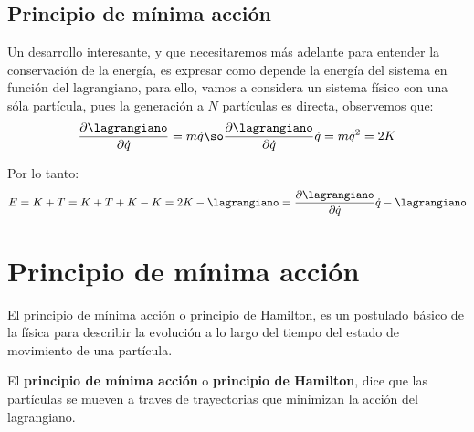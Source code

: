 \subsection{Principio de mínima acción}
Un desarrollo interesante, y que necesitaremos más adelante para entender la conservación de la energía, es expresar como depende la energía del sistema en función del lagrangiano, para ello, vamos a considera un sistema físico con una sóla partícula, pues la generación a $N$ partículas es directa, observemos que:
\begin{equation*}
	\frac{\partial\lagrangiano}{\partial\dot{q}} =m\dot{q}\so \frac{\partial\lagrangiano}{\partial\dot{q}}\dot{q} =m\dot{q}^2 = 2K
\end{equation*}

Por lo tanto:
\begin{equation}
	\label{eq:energia-lagrangiana}
	E=K+T=K+T+K-K=2K-\lagrangiano=\frac{\partial\lagrangiano}{\partial\dot{q}}\dot{q}-\lagrangiano
\end{equation}

\section{Principio de mínima acción}\label{sec:principio-de-minima-accion}

El principio de mínima acción o principio de Hamilton, es un postulado básico de la física para describir la evolución a lo largo del tiempo del estado de movimiento de una partícula.

El \textbf{principio de mínima acción} o \textbf{principio de Hamilton}, dice que las partículas se mueven a traves de trayectorias que minimizan la acción del lagrangiano.
